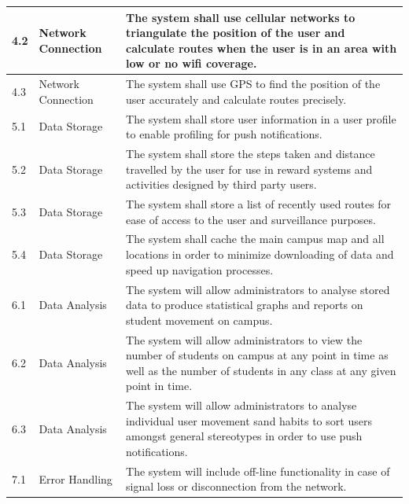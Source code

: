 \documentclass[12pt]{article}
\begin{document}
\begin{longtable}{|p{}| p{} | p{} |}
4.2& Network Connection & The system shall use cellular networks to triangulate the position of the user and calculate routes when the user is in an area with low or no wifi coverage.\\

\hline

4.3& Network Connection & The system shall use GPS to find the position of the user accurately and calculate routes precisely.\\
\hline

5.1& Data Storage & The system shall store user information in a user profile to enable profiling for push notifications.\\

\hline

5.2& Data Storage & The system shall store the steps taken and distance travelled by the user for use in reward systems and activities designed by third party users.\\

\hline

5.3& Data Storage & The system shall store a list of recently used routes for ease of access to the user and surveillance purposes.\\

\hline

5.4& Data Storage & The system shall cache the main campus map and all locations in order to minimize downloading of data and speed up navigation processes.\\

\hline

6.1& Data Analysis & The system will allow administrators to analyse stored data to produce statistical graphs and reports on student movement on campus.\\

\hline

6.2& Data Analysis & The system will allow administrators to view the number of students on campus at any point in time as well as the number of students in any class at any given point in time.\\

\hline

6.3& Data Analysis & The system will allow administrators to analyse individual user movement sand habits to sort users amongst general stereotypes in order to use push notifications.\\

\hline

7.1& Error Handling & The system will include off-line functionality in case of signal loss or disconnection from the network.\\


\end{longtable}
\end{document}
